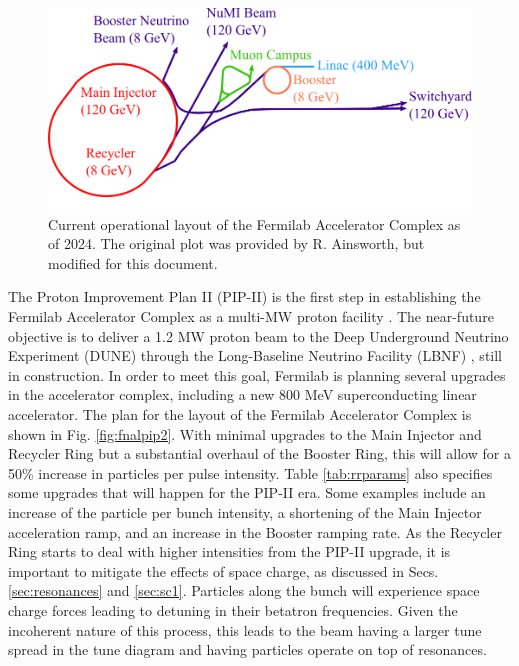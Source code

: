 \begin{figure}[H]
   \centering
   \includegraphics[width=\columnwidth]{chapter3/complex_noTev.png}
   \caption{Current operational layout of the Fermilab Accelerator Complex as of 2024. The original plot was provided by R. Ainsworth, but modified for this document.}
   \label{fig:fnal}
   \vspace{-1.25em}
\end{figure}

The Proton Improvement Plan II (PIP-II) is the first step in establishing the Fermilab Accelerator Complex as a multi-MW proton facility \cite{pipII1}. The near-future objective is to deliver a 1.2 MW proton beam to the Deep Underground Neutrino Experiment (DUNE) through the Long-Baseline Neutrino Facility (LBNF) \cite{dune}, still in construction. In order to meet this goal, Fermilab is planning several upgrades in the accelerator complex, including a new 800 MeV superconducting linear accelerator. The plan for the layout of the Fermilab Accelerator Complex is shown in Fig. \ref{fig:fnalpip2}. With minimal upgrades to the Main Injector and Recycler Ring but a substantial overhaul of the Booster Ring, this will allow for a 50\% increase in particles per pulse intensity. Table \ref{tab:rrparams} also specifies some upgrades that will happen for the PIP-II era. Some examples include an increase of the particle per bunch intensity, a shortening of the Main Injector acceleration ramp, and an increase in the Booster ramping rate. As the Recycler Ring starts to deal with higher intensities from the PIP-II upgrade, it is important to mitigate the effects of space charge, as discussed in Secs. \ref{sec:resonances} and \ref{sec:sc1}. Particles along the bunch will experience space charge forces leading to detuning in their betatron frequencies. Given the incoherent nature of this process, this leads to the beam having a larger tune spread in the tune diagram and having particles operate on top of resonances.

